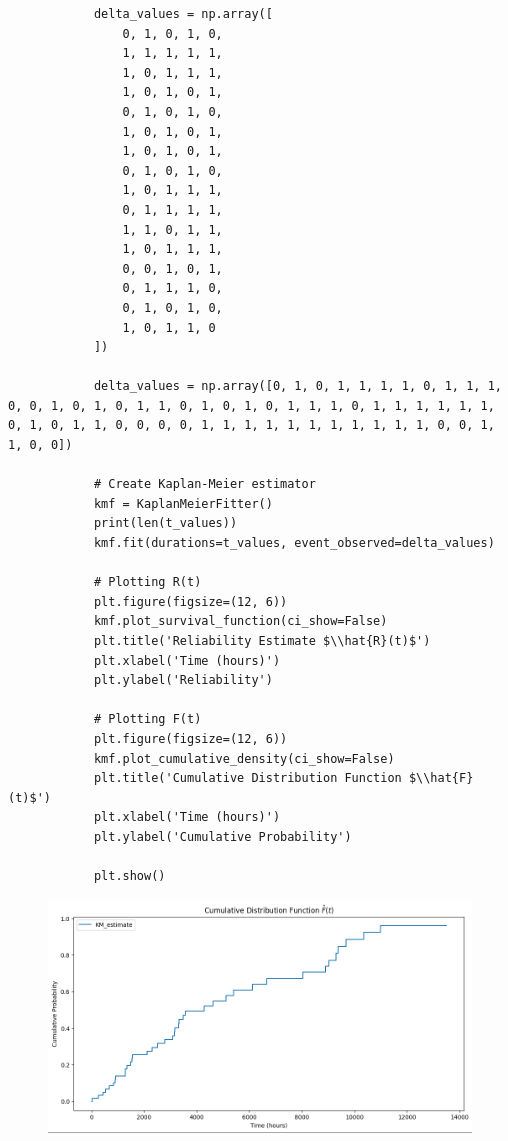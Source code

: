 \documentclass{article}
\begin{document}
\begin{enumerate}[label=(\alph*)]
\begin{enumerate}[label=(\alph*)]
\begin{flushleft}
\begin{lstlisting}
            delta_values = np.array([
                0, 1, 0, 1, 0,
                1, 1, 1, 1, 1,
                1, 0, 1, 1, 1,
                1, 0, 1, 0, 1,
                0, 1, 0, 1, 0,
                1, 0, 1, 0, 1,
                1, 0, 1, 0, 1,
                0, 1, 0, 1, 0,
                1, 0, 1, 1, 1,
                0, 1, 1, 1, 1,
                1, 1, 0, 1, 1,
                1, 0, 1, 1, 1,
                0, 0, 1, 0, 1,
                0, 1, 1, 1, 0,
                0, 1, 0, 1, 0,
                1, 0, 1, 1, 0
            ])
            
            delta_values = np.array([0, 1, 0, 1, 1, 1, 1, 0, 1, 1, 1, 0, 0, 1, 0, 1, 0, 1, 1, 0, 1, 0, 1, 0, 1, 1, 1, 0, 1, 1, 1, 1, 1, 1, 0, 1, 0, 1, 1, 0, 0, 0, 0, 1, 1, 1, 1, 1, 1, 1, 1, 1, 1, 1, 0, 0, 1, 1, 0, 0]) 
            
            # Create Kaplan-Meier estimator
            kmf = KaplanMeierFitter()
            print(len(t_values))
            kmf.fit(durations=t_values, event_observed=delta_values)
            
            # Plotting R(t)
            plt.figure(figsize=(12, 6))
            kmf.plot_survival_function(ci_show=False)
            plt.title('Reliability Estimate $\\hat{R}(t)$')
            plt.xlabel('Time (hours)')
            plt.ylabel('Reliability')
            
            # Plotting F(t)
            plt.figure(figsize=(12, 6))
            kmf.plot_cumulative_density(ci_show=False)
            plt.title('Cumulative Distribution Function $\\hat{F}(t)$')
            plt.xlabel('Time (hours)')
            plt.ylabel('Cumulative Probability')
            
            plt.show()
            \end{lstlisting}

        \begin{flushleft}
            \begin{figure}[H]
                \centering
                \includegraphics[width=0.7\linewidth]{ft_q4.png}
                \label{fig:q4Ftt}
            \end{figure}
        \end{flushleft}


\end{flushleft}
\end{enumerate}
\end{enumerate}
\end{document}
